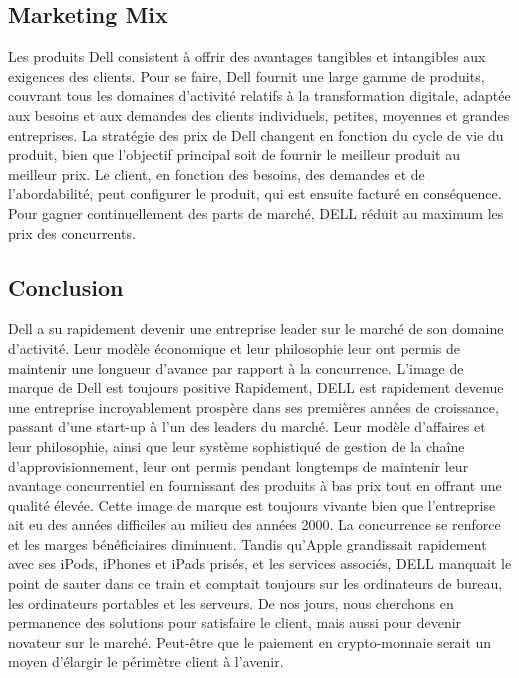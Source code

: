 \documentclass{bredele} %
\begin{document}
                \subsection*{Marketing Mix}
                Les produits Dell consistent à offrir des avantages tangibles et intangibles aux exigences des clients. Pour se faire, Dell fournit une large gamme de produits, couvrant tous les domaines d’activité relatifs à la transformation digitale, adaptée aux besoins et aux demandes des clients individuels, petites, moyennes et grandes entreprises.
    \newline
    La stratégie des prix de Dell changent en fonction du cycle de vie du produit, bien que l’objectif principal soit de fournir le meilleur produit au meilleur prix.
    \newline
    Le client, en fonction des besoins, des demandes et de l'abordabilité, peut configurer le produit, qui est ensuite facturé en conséquence. Pour gagner continuellement des parts de marché, DELL réduit au maximum les prix des concurrents.
                \subsection*{Conclusion}
                Dell a su rapidement devenir une entreprise leader sur le marché de son domaine d’activité. Leur modèle économique et leur philosophie leur ont permis de maintenir une longueur d’avance par rapport à la concurrence.
    \newline
    L’image de marque de Dell est toujours positive
    \newline
    \newline
    Rapidement, DELL est rapidement devenue une entreprise incroyablement prospère dans ses premières années de croissance, passant d'une start-up à l'un des leaders du marché. Leur modèle d'affaires et leur philosophie, ainsi que leur système sophistiqué de gestion de la chaîne d'approvisionnement, leur ont permis pendant longtemps de maintenir leur avantage concurrentiel en fournissant des produits à bas prix tout en offrant une qualité élevée.
    \newline
    Cette image de marque est toujours vivante bien que l'entreprise ait eu des années difficiles au milieu des années 2000. La concurrence se renforce et les marges bénéficiaires diminuent. Tandis qu'Apple grandissait rapidement avec ses iPods, iPhones et iPads prisés, et les services associés, DELL manquait le point de sauter dans ce train et comptait toujours sur les ordinateurs de bureau, les ordinateurs portables et les serveurs.
    \newline
    \newline
    De nos jours, nous cherchons en permanence des solutions pour satisfaire le client, mais aussi pour devenir novateur sur le marché. Peut-être que le paiement en crypto-monnaie serait un moyen d'élargir le périmètre client à l'avenir.
\end{document}
